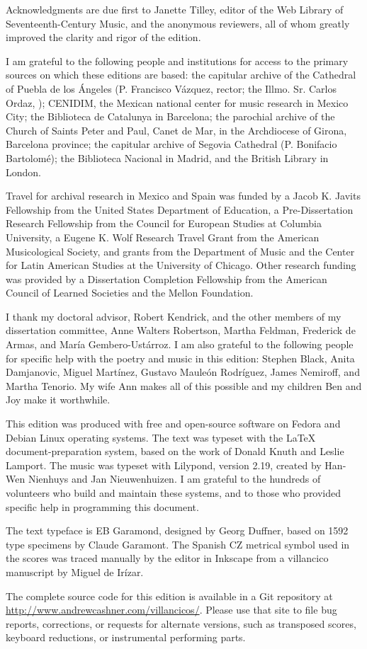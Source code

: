 Acknowledgments are due first to Janette Tilley, editor of the Web Library of
Seventeenth-Century Music, and the anonymous reviewers, all of whom greatly
improved the clarity and rigor of the edition.

I am grateful to the following people and institutions for access to the 
primary sources on which these editions are based: 
the capitular archive of the Cathedral of Puebla de los Ángeles (P. Francisco 
Vázquez, rector; the Illmo. Sr. Carlos Ordaz, );
CENIDIM, the Mexican national center for music research in Mexico City;
the Biblioteca de Catalunya in Barcelona;
the parochial archive of the Church of Saints Peter and Paul, Canet de Mar, in 
the Archdiocese of Girona, Barcelona province;
the capitular archive of Segovia Cathedral (P. Bonifacio Bartolomé);
the Biblioteca Nacional in Madrid, and
the British Library in London.

Travel for archival research in Mexico and Spain was funded by 
a Jacob K. Javits Fellowship from the United States Department of Education, 
a Pre-Dissertation Research Fellowship from the Council for European Studies at 
Columbia University, 
a Eugene K. Wolf Research Travel Grant from the American Musicological Society, 
and grants from the Department of Music and the Center for Latin American 
Studies at the University of Chicago.
Other research funding was provided by a Dissertation Completion Fellowship 
from the American Council of Learned Societies and the Mellon Foundation.

I thank my doctoral advisor, Robert Kendrick, and the other members of my 
dissertation committee, Anne Walters Robertson, Martha Feldman, Frederick de 
Armas, and María Gembero-Ustárroz.
I am also grateful to the following people for specific help with the poetry 
and music in this edition:
Stephen Black,
Anita Damjanovic, 
Miguel Martínez, 
Gustavo Mauleón Rodríguez,
James Nemiroff, and
Martha Tenorio.
My wife Ann makes all of this possible and my children Ben and Joy make it
worthwhile.


This edition was produced with free and open-source software on Fedora and
Debian Linux operating systems.
The text was typeset with the \LaTeX{} document-preparation system, based on 
the work of Donald Knuth and Leslie Lamport.
The music was typeset with Lilypond, version 2.19, created by Han-Wen Nienhuys
and Jan Nieuwenhuizen.
I am grateful to the hundreds of volunteers who build and maintain these 
systems, and to those who provided specific help in programming this document.

The text typeface is EB Garamond, designed by Georg Duffner, based on 1592 type 
specimens by Claude Garamont.
The Spanish CZ metrical symbol used in the scores was traced manually by the
editor in Inkscape from a villancico manuscript by Miguel de Irízar.

The complete source code for this edition is available in a Git repository at
\url{http://www.andrewcashner.com/villancicos/}.
Please use that site to file bug reports, corrections, or requests for alternate
versions, such as transposed scores, keyboard reductions, or instrumental
performing parts.


